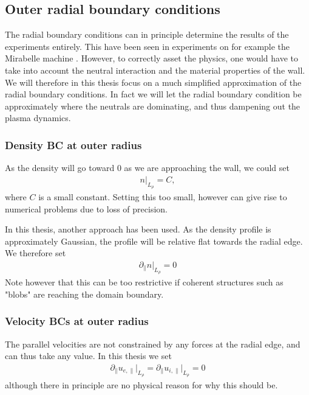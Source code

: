 \subsection{Outer radial boundary conditions}
\label{sec:outerBC}
%
The radial boundary conditions can in principle determine the results of the experiments entirely.
This have been seen in experiments on for example the Mirabelle machine \cite{Schroder2001}.
However, to correctly asset the physics, one would have to take into account the neutral interaction and the material properties of the wall.
We will therefore in this thesis focus on a much simplified approximation of the radial boundary conditions.
In fact we will let the radial boundary condition be approximately where the neutrals are dominating, and thus dampening out the plasma dynamics.

\subsubsection{Density BC at outer radius}
As the density will go toward $0$ as we are approaching the wall, we could set
%
\begin{align*}
    n \bigg|_{L_\rho} = C,
\end{align*}
%
where $C$ is a small constant.
Setting this too small, however can give rise to numerical problems due to loss of precision.

In this thesis, another approach has been used.
As the density profile is approximately Gaussian, the profile will be relative flat towards the radial edge.
We therefore set
%
\begin{align*}
    \partial_\| n \bigg|_{L_\rho} = 0
\end{align*}
%
Note however that this can be too restrictive if coherent structures such as "blobs"
are reaching the domain boundary.

\subsubsection{Velocity BCs at outer radius}
%
The parallel velocities are not constrained by any forces at the radial edge, and can thus take any value.
In this thesis we set
%
\begin{align*}
    \partial_\| u_{e,\|} \bigg|_{L_\rho} = \partial_\| u_{i,\|} \bigg|_{L_\rho} = 0
\end{align*}
%
although there in principle are no physical reason for why this should be.

